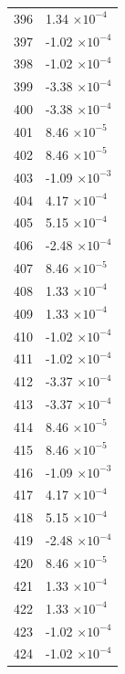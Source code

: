 \documentclass[a4paper,11pt]{article}
\begin{document}
\begin{center}
\begin{longtable}{|R{1.5cm}|R{2.5cm}|}
  396 &         1.34 $\times 10^{          -4}$ \\
  397 &        -1.02 $\times 10^{          -4}$ \\
  398 &        -1.02 $\times 10^{          -4}$ \\
  399 &        -3.38 $\times 10^{          -4}$ \\
  400 &        -3.38 $\times 10^{          -4}$ \\
  401 &         8.46 $\times 10^{          -5}$ \\
  402 &         8.46 $\times 10^{          -5}$ \\
  403 &        -1.09 $\times 10^{          -3}$ \\
  404 &         4.17 $\times 10^{          -4}$ \\
  405 &         5.15 $\times 10^{          -4}$ \\
  406 &        -2.48 $\times 10^{          -4}$ \\
  407 &         8.46 $\times 10^{          -5}$ \\
  408 &         1.33 $\times 10^{          -4}$ \\
  409 &         1.33 $\times 10^{          -4}$ \\
  410 &        -1.02 $\times 10^{          -4}$ \\
  411 &        -1.02 $\times 10^{          -4}$ \\
  412 &        -3.37 $\times 10^{          -4}$ \\
  413 &        -3.37 $\times 10^{          -4}$ \\
  414 &         8.46 $\times 10^{          -5}$ \\
  415 &         8.46 $\times 10^{          -5}$ \\
  416 &        -1.09 $\times 10^{          -3}$ \\
  417 &         4.17 $\times 10^{          -4}$ \\
  418 &         5.15 $\times 10^{          -4}$ \\
  419 &        -2.48 $\times 10^{          -4}$ \\
  420 &         8.46 $\times 10^{          -5}$ \\
  421 &         1.33 $\times 10^{          -4}$ \\
  422 &         1.33 $\times 10^{          -4}$ \\
  423 &        -1.02 $\times 10^{          -4}$ \\
  424 &        -1.02 $\times 10^{          -4}$ \\

\end{longtable}
\end{center}
\end{document}
